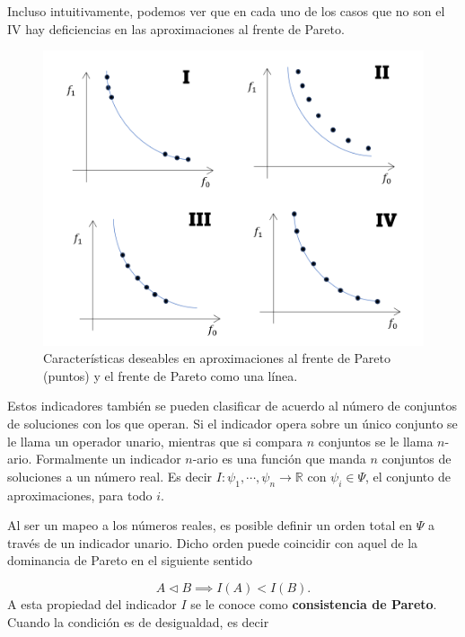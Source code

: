 Incluso intuitivamente, podemos ver que en cada uno de los casos que no son el IV hay deficiencias en las aproximaciones al frente de Pareto. 

\begin{figure}[H]
    \centering
    \includegraphics[scale=0.5]{Figuras/carac_deseables_Pareto.png}
    \caption[Características deseables en aproximación al PF]{Características deseables en aproximaciones al frente de Pareto (puntos) y el frente de Pareto como una línea.}
    \label{fig:carac_deseables_aprox}
\end{figure}

Estos indicadores también se pueden clasificar de acuerdo al número de conjuntos de soluciones con los que operan. Si el indicador opera sobre un único conjunto  se le llama un operador unario, mientras que si compara $n$ conjuntos se le llama $n$-ario. Formalmente un indicador $n$-ario \cite{PFI} es  una función que manda  $n$ conjuntos de soluciones a un número real. Es decir $I:\psi_1,\cdots,\psi_n \rightarrow \mathbb{R}$ con $\psi_i \in  \Psi$, el conjunto de aproximaciones, para todo $i$. 


Al ser un mapeo a los números reales, es posible definir un orden total en $\Psi$ a través de un indicador unario. Dicho orden puede coincidir con aquel de la dominancia de Pareto en el siguiente sentido

\begin{equation} \label{eq:consistente_Pareto}
    A \vartriangleleft B \implies I(A) < I(B).
\end{equation}
A esta propiedad del indicador $I$ se le conoce como \textbf{consistencia de Pareto}. Cuando la condición es de desigualdad, es decir 

